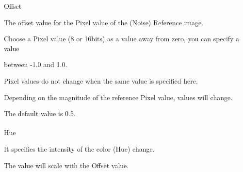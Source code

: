 \documentclass[a4paper,12pt]{article}
\begin{document}
Offset\par
The offset value for the Pixel value of the (Noise) Reference image.\par
Choose a Pixel value (8 or 16bits) as a value away from zero, you can specify a value\par
between -1.0 and 1.0.\par
Pixel values do not change when the same value is specified here.\par
Depending on the magnitude of the reference Pixel value, values will change.\par
The default value is 0.5.\\
\\
Hue\par
It specifies the intensity of the color (Hue) change.\par
The value will scale with the Offset value.

\newpage

\thispagestyle{empty}
\end{document}
